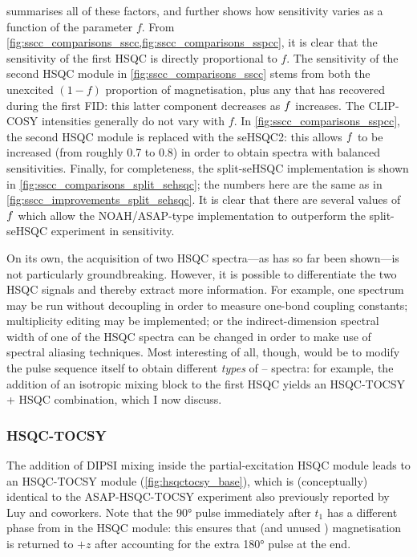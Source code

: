  summarises all of these factors, and further shows how sensitivity varies as a function of the parameter $f$.
From \cref{fig:sscc_comparisons_sscc,fig:sscc_comparisons_sspcc}, it is clear that the sensitivity of the first HSQC is directly proportional to $f$.
The sensitivity of the second HSQC module in \cref{fig:sscc_comparisons_sscc} stems from both the unexcited $(1 - f)$ proportion of  magnetisation, plus any that has recovered during the first FID: this latter component decreases as $f\/$ increases.
The CLIP-COSY intensities generally do not vary with $f$.
In \cref{fig:sscc_comparisons_sspcc}, the second HSQC module is replaced with the seHSQC2: this allows $f\/$ to be increased (from roughly 0.7 to 0.8) in order to obtain spectra with balanced sensitivities.
Finally, for completeness, the split-seHSQC implementation is shown in \cref{fig:sscc_comparisons_split_sehsqc}; the numbers here are the same as in \cref{fig:sscc_improvements_split_sehsqc}.
It is clear that there are several values of $f\/$ which allow the NOAH/ASAP-type implementation to outperform the split-seHSQC experiment in sensitivity.

On its own, the acquisition of two HSQC spectra---as has so far been shown---is not particularly groundbreaking.
However, it is possible to differentiate the two HSQC signals and thereby extract more information.
For example, one spectrum may be run without decoupling in order to measure one-bond coupling constants\autocite{Enthart2008JMR,Nolis2019CPC}; multiplicity editing may be implemented\autocite{SchulzeSunninghausen2017JMR}; or the indirect-dimension spectral width of one of the HSQC spectra can be changed in order to make use of spectral aliasing techniques\autocite{Nolis2019JMR,Jeannerat2011eMR}.
Most interesting of all, though, would be to modify the pulse sequence itself to obtain different \textit{types} of \proton{}--\carbon{} spectra: for example, the addition of an isotropic mixing block to the first HSQC yields an HSQC-TOCSY + HSQC combination\autocite{Nolis2019CPC}, which I now discuss.


\subsubsection{HSQC-TOCSY}

The addition of DIPSI mixing inside the partial-excitation HSQC module leads to an HSQC-TOCSY module (\cref{fig:hsqctocsy_base}), which is (conceptually) identical to the ASAP-HSQC-TOCSY experiment also previously reported by Luy and coworkers\autocite{Becker2019JMR}.
Note that the \proton{} \ang{90} pulse immediately after $t_1$ has a different phase from in the HSQC module: this ensures that  (and unused ) magnetisation is returned to $+z$ after accounting for the extra \ang{180} pulse at the end.

